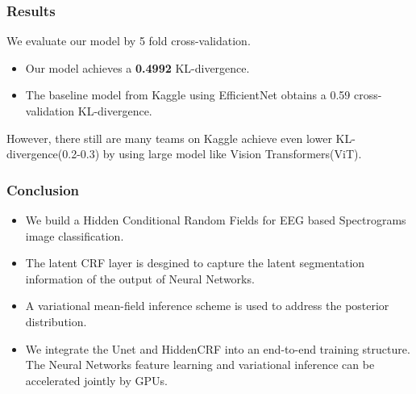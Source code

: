 \documentclass[leqno]{beamer}
\begin{document}
\begin{frame}
	\frametitle{Results}
	We evaluate our model by 5 fold cross-validation.
	\begin{itemize}
		\item Our model achieves a \textbf{0.4992} KL-divergence.
		\item The baseline model from Kaggle using EfficientNet obtains a 0.59 cross-validation KL-divergence.
	\end{itemize}
	However, there still are many teams on Kaggle achieve even lower KL-divergence(0.2-0.3) by using large model like Vision Transformers(ViT).
\end{frame}
\begin{frame}
	\frametitle{Conclusion}
	\begin{itemize}
		\item We build a Hidden Conditional Random Fields for EEG based Spectrograms image classification.
		\item The latent CRF layer is desgined to capture the latent segmentation information of the output of Neural Networks.
		\item A variational mean-field inference scheme is used to address the posterior distribution.
		\item We integrate the Unet and HiddenCRF into an end-to-end training structure. The Neural Networks feature learning and 
		variational inference can be accelerated jointly by GPUs.
	\end{itemize}
\end{frame}




%
%
\end{document}
